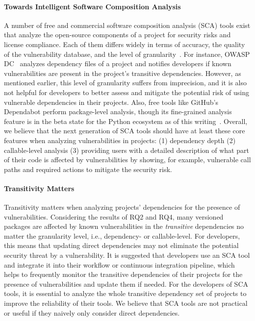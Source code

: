 \paragraph{Towards Intelligent Software Composition Analysis}
A number of free and commercial software composition analysis (SCA) tools exist that analyze the open-source components of a project for security risks and license compliance. Each of them differs widely in terms of accuracy, the quality of the vulnerability database, and the level of granularity~\cite{imtiaz2021comparative}. For instance, OWASP DC~\cite{owaspdepchk} analyzes dependency files of a project and notifies developers if known vulnerabilities are present in the project's transitive dependencies. However, as mentioned earlier, this level of granularity suffers from imprecision, and it is also not helpful for developers to better assess and mitigate the potential risk of using vulnerable dependencies in their projects. Also, free tools like GitHub's Dependabot perform package-level analysis, though its fine-grained analysis feature is in the beta state for the Python ecosystem as of this writing~\cite{ghd}. Overall, we believe that the next generation of SCA tools should have at least these core features when analyzing vulnerabilities in projects: (1) dependency depth (2) callable-level analysis (3) providing users with a detailed description of what part of their code is affected by vulnerabilities by showing, for example, vulnerable call paths and required actions to mitigate the security risk.

\paragraph{Transitivity Matters}
Transitivity matters when analyzing projects' dependencies for the presence of vulnerabilities.
Considering the results of RQ2 and RQ4, many versioned packages are affected by known vulnerabilities in the \textit{transitive} dependencies no matter the granularity level, i.e., dependency- or callable-level. For developers, this means that updating direct dependencies may not eliminate the potential security threat by a vulnerability. It is suggested that developers use an SCA tool and integrate it into their workflow or continuous integration pipeline, which helps to frequently monitor the transitive dependencies of their projects for the presence of vulnerabilities and update them if needed. For the developers of SCA tools, it is essential to analyze the whole transitive dependency set of projects to improve the reliability of their tools. We believe that SCA tools are not practical or useful if they naively only consider direct dependencies.

